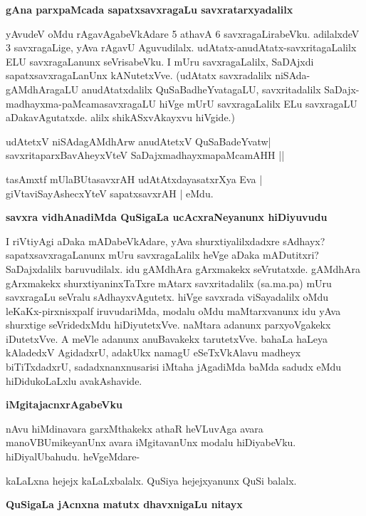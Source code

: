 {\bigskip
\noindent
{\large\bf gAna parxpaMcada sapatxsavxragaLu savxratarxyadalilx}}
\medskip

\noindent
yAvudeV oMdu rAgavAgabeVkAdare 5 athavA 6 savxragaLirabeVku. adilalxdeV 3 savxragaLige, yAva \-rAgavU Aguvudilalx. udAtatx-anudAtatx-savxritagaLalilx ELU savxragaLanunx seVrisabeVku. I mUru savxra\-gaLalilx, SaDAjxdi sapatxsavxragaLanUnx kANutetxVve. (udAtatx savxradalilx niSAda-gAMdhAragaLU anudAtatxdalilx QuSaBa\-dheYvatagaLU, savxritadalilx SaDajx-madhayxma-paMcamasavxragaLU hiVge mUrU savxragaLalilx ELu savxragaLU aDaka\-vAgu\-tatxde. alilx shikASxvAkayxvu hiVgide.)

\begin{shloka}
udAtetxV niSAdagAMdhArw anudAtetxV QuSaBadeYvatw|\\\label{122}
savxritaparxBavAheyxVteV SaDajxmadhayxmapaMcamAHH ||
\end{shloka}

\begin{shloka}
tasAmxtf mUlaBUtasavxrAH udAtAtxdayasatxrXya Eva |\\
giVtaviSayAshecxYteV sapatxsavxrAH | eMdu.
\end{shloka}

{\bigskip
\noindent
{\large\bf savxra vidhAnadiMda QuSigaLa ucAcxraNeyanunx hiDiyuvudu}}\label{page122}
\medskip

\noindent
I riVtiyAgi aDaka mADabeVkAdare, yAva shurxtiyalilxdadxre sAdhayx? sapatxsavxragaLanunx mUru savxra\-gaLalilx heVge aDaka mADutitxri? SaDajxdalilx baruvudilalx. idu gAMdhAra gArxmakekx seVrutatxde. gAMdhAra gArxmakekx shurxti\-yaninx\-TaTxre mAtarx savxritadalilx (sa.ma.pa) mUru savxragaLu seVralu sAdhayxvAgutetx. hiVge savxrada viSaya\-dalilx oMdu leKaKx-pirxnisxpalf iruvudariMda, modalu oMdu maMtarxvanunx idu yAva shurxtige seVridedxMdu hiDiyutetxVve. naMtara adanunx parxyoVgakekx iDutetxVve. A meVle adanunx anuBavakekx tarutetxVve. bahaLa haLeya kAladedxV AgidadxrU, adakUkx namagU eSeTxVkAlavu madheyx biTiTxdadxrU, sadadxnanxnusarisi iMta\-ha jAgadiMda baMda sadudx eMdu hiDidukoLaLxlu avakAshavide.

{\medskip
\noindent
{\large\bf iMgitajacnxrAgabeVku}}
\medskip

\noindent
nAvu hiMdinavara garxMthakekx athaR heVLuvAga avara manoVBUmikeyanUnx avara iMgitavanUnx moda\-lu hiDiyabeVku. hiDiyalUbahudu. heVgeMdare- 

kaLaLxna hejejx kaLaLxbalalx. QuSiya hejejxyanunx QuSi balalx.

{\medskip
\noindent
{\large\bf QuSigaLa jAcnxna matutx dhavxnigaLu nitayx}}\label{page122}
\medskip

